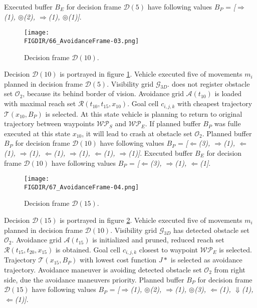 Executed buffer $B_E$ for decision frame $\mathscr{D}(5)$ have following values $B_P$ = \textit{[$\Rightarrow$(1), $\circledcirc$(2), $\Rightarrow$(1), $\circledcirc$(1)]}.     
\begin{figure}[H]
    \centering
    \texttt{[image: \\FIGDIR/66\_AvoidanceFrame-03.png]}
    \caption{Decision frame $\mathscr{D}(10)$.}
    \label{fig:decisionFrameSimple10}
\end{figure}
\noindent Decision $\mathscr{D}(10)$ is portrayed in figure \ref{fig:decisionFrameSimple10}. Vehicle executed five of movements $m_i$ planned in decision frame $\mathscr{D}(5)$. Visibility grid $\mathscr{G}_{3D}$. does not register obstacle set $\mathscr{O}_2$, because its behind border of vision. Avoidance grid $\mathscr{A}(t_{10})$ is loaded with maximal reach set $\mathscr{R}(t_{10},t_{15},x_{10})$. Goal cell $c_{i,j,k}$ with cheapest trajectory $\mathscr{T}(x_{10},B_P)$ is selected. At this state vehicle is planning to return to original trajectory between waypoints $\mathscr{WP}_S$ and $\mathscr{WP}_E$. If planned buffer $B_P$ was fulle executed at this state $x_{10}$, it will lead to crash at obstacle set $\mathscr{O}_2$.
Planned buffer $B_P$ for decision frame $\mathscr{D}(10)$ have following values $B_P$ = \textit{ [$\Leftarrow$(3), $\Rightarrow$(1), $\Leftarrow$(1), $\Rightarrow$(1), $\Leftarrow$(1), $\Rightarrow$(1), $\Leftarrow$(1), $\Rightarrow$(1)]}.
Executed buffer $B_E$ for decision frame $\mathscr{D}(10)$ have following values $B_P$ = \textit{[$\Leftarrow$(3), $\Rightarrow$(1), $\Leftarrow$(1]}.
\begin{figure}[H]
    \centering
    \texttt{[image: \\FIGDIR/67\_AvoidanceFrame-04.png]}
    \caption{Decision frame $\mathscr{D}(15)$.}
    \label{fig:decisionFrameSimple15}
\end{figure}
\noindent Decision $\mathscr{D}(15)$ is portrayed in figure \ref{fig:decisionFrameSimple15}. Vehicle executed five of movements $m_i$ planned in decision frame $\mathscr{D}(10)$. Visibility grid $\mathscr{G}_{3D}$ has detected obstacle set $\mathscr{O}_2$. Avoidance grid $\mathscr{A}(t_{15})$ is initialized and pruned, reduced reach set $\mathscr{R}(t_{15},t_{20},x_{15})$ is obtained. Goal cell $c_{i,j,k}$ closest to waypoint $\mathscr{WP}_E$ is selected. Trajectory $\mathscr{T}(x_{15},B_P)$ with lowest cost function $J*$ is selected as avoidance trajectory. Avoidance maneuver is avoiding detected obstacle set $\mathscr{O}_2$ from right side, due the avoidance maneuvers priority. 
Planned buffer $B_P$ for decision frame $\mathscr{D}(15)$ have following values $B_P$ = \textit{
[$\Rightarrow$(1), $\circledcirc$(2), $\Rightarrow$(1), $\circledcirc$(3), $\Leftarrow$(1), $\Downarrow$(1), $\Leftarrow$(1)]}.
